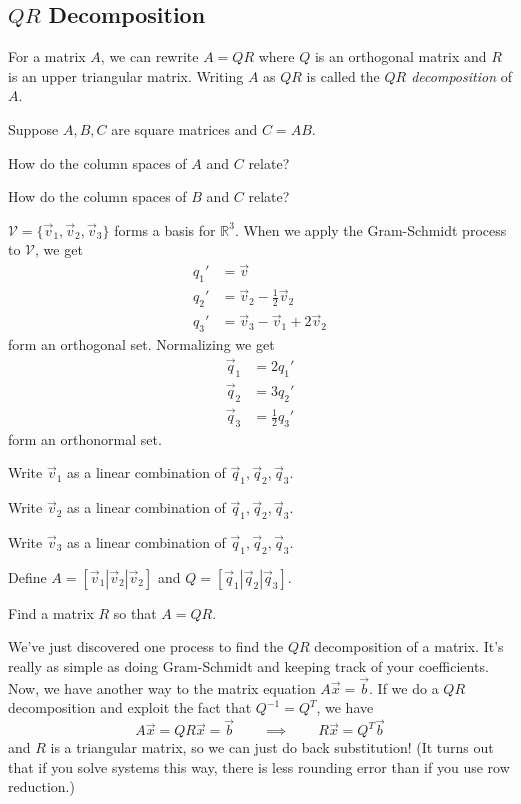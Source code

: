 \documentclass[14pt]{problemset}
\newcommand{\R}{\mathbb{R}}
\begin{document}
\subsection*{$QR$ Decomposition}

	\begin{definition}[$QR$ Decomposition]
		For a matrix $A$, we can rewrite $A=QR$ where $Q$ is an
		orthogonal matrix and $R$ is an upper triangular matrix.  Writing
		$A$ as $QR$ is called the \emph{$QR$ decomposition} of $A$.
	\end{definition}

	\question
	Suppose $A,B,C$ are square matrices and $C=AB$.
	\begin{parts}
		\item How do the column spaces of $A$ and $C$ relate?
		\item How do the column spaces of $B$ and $C$ relate?
	\end{parts}

	\question
	$\mathcal V=\{\vec v_1,\vec v_2,\vec v_3\}$ forms a basis for $\R^3$.
	When we apply the Gram-Schmidt process to $\mathcal V$, we get
	\[
		\begin{array}{rl}
			q_1' &=\vec v\\
			q_2' &= \vec v_2-\frac{1}{2}\vec v_2\\
			q_3' &= \vec v_3-\vec v_1+2\vec v_2
		\end{array}
	\]
	form an orthogonal set.  Normalizing we get
	\[
		\begin{array}{rl}
			\vec q_1 &= 2q_1'\\
			\vec q_2 &= 3q_2'\\
			\vec q_3 &=\frac{1}{2}q_3'
		\end{array}
	\]
	form an orthonormal set.
	\begin{parts}
		\item Write $\vec v_1$ as a linear combination of $\vec q_1,\vec q_2,\vec q_3$.
		\item Write $\vec v_2$ as a linear combination of $\vec q_1,\vec q_2,\vec q_3$.
		\item Write $\vec v_3$ as a linear combination of $\vec q_1,\vec q_2,\vec q_3$.
	\end{parts}
	Define $A=[\vec v_1|\vec v_2|\vec v_2]$ and $Q=[\vec q_1|\vec q_2|\vec q_3]$.
	\begin{parts}[resume]
		\item Find a matrix $R$ so that $A=QR$.
	\end{parts}
	
	We've just discovered one process to find the $QR$ decomposition of a matrix.
	It's really as simple as doing Gram-Schmidt and keeping track of your coefficients.
	Now, we have another way to the matrix equation $A\vec x=\vec b$.  If we do a $QR$
	decomposition and exploit the fact that $Q^{-1}=Q^T$, we have
	\[
		A\vec x=QR\vec x=\vec b\qquad\implies\qquad R\vec x=Q^T\vec b
	\]
	and $R$ is a triangular matrix, so we can just do back substitution! (It turns
	out that if you solve systems this way, there is less rounding error than if you
	use row reduction.)
\end{document}
